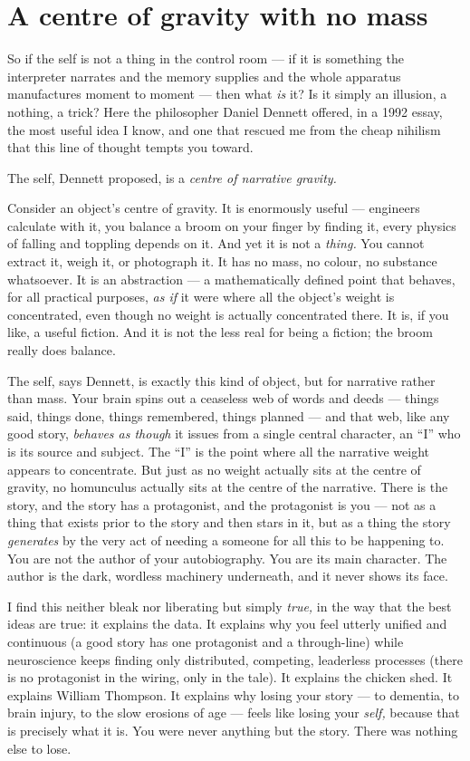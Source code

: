 \section*{A centre of gravity with no mass}

So if the self is not a thing in the control room — if it is something the interpreter narrates and the memory supplies and the whole apparatus manufactures moment to moment — then what \emph{is} it? Is it simply an illusion, a nothing, a trick? Here the philosopher Daniel Dennett offered, in a 1992 essay, the most useful idea I know, and one that rescued me from the cheap nihilism that this line of thought tempts you toward.

The self, Dennett proposed, is a \emph{centre of narrative gravity.}

Consider an object's centre of gravity. It is enormously useful — engineers calculate with it, you balance a broom on your finger by finding it, every physics of falling and toppling depends on it. And yet it is not a \emph{thing.} You cannot extract it, weigh it, or photograph it. It has no mass, no colour, no substance whatsoever. It is an abstraction — a mathematically defined point that behaves, for all practical purposes, \emph{as if} it were where all the object's weight is concentrated, even though no weight is actually concentrated there. It is, if you like, a useful fiction. And it is not the less real for being a fiction; the broom really does balance.

The self, says Dennett, is exactly this kind of object, but for narrative rather than mass. Your brain spins out a ceaseless web of words and deeds — things said, things done, things remembered, things planned — and that web, like any good story, \emph{behaves as though} it issues from a single central character, an ``I'' who is its source and subject. The ``I'' is the point where all the narrative weight appears to concentrate. But just as no weight actually sits at the centre of gravity, no homunculus actually sits at the centre of the narrative. There is the story, and the story has a protagonist, and the protagonist is you — not as a thing that exists prior to the story and then stars in it, but as a thing the story \emph{generates} by the very act of needing a someone for all this to be happening to. You are not the author of your autobiography. You are its main character. The author is the dark, wordless machinery underneath, and it never shows its face.

I find this neither bleak nor liberating but simply \emph{true,} in the way that the best ideas are true: it explains the data. It explains why you feel utterly unified and continuous (a good story has one protagonist and a through-line) while neuroscience keeps finding only distributed, competing, leaderless processes (there is no protagonist in the wiring, only in the tale). It explains the chicken shed. It explains William Thompson. It explains why losing your story — to dementia, to brain injury, to the slow erosions of age — feels like losing your \emph{self,} because that is precisely what it is. You were never anything but the story. There was nothing else to lose.

